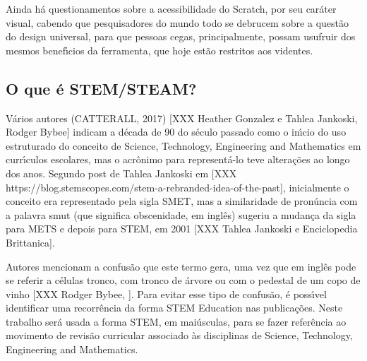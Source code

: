 \documentclass[
12pt,		%
openright,	%
twoside,  %
a4paper,			%
chapter=TITLE,		%
english,			%
french,				%
spanish,			%
brazil				%
]{USPSC-classe/USPSC}
\begin{document}
Ainda h\'a questionamentos sobre a acessibilidade do Scratch, por seu car\'ater visual, cabendo que pesquisadores do mundo todo se debrucem sobre a quest\~ao do design universal, para que pessoas cegas, principalmente, possam usufruir dos mesmos benef\'{\i}cios da ferramenta, que hoje est\~ao restritos aos videntes.

















\subsection[O que \'e STEM/STEAM?]{O que \'e STEM/STEAM?}\label{O que \'e STEM/STEAM?}
V\'arios autores  (CATTERALL, 2017)  [XXX Heather Gonzalez e  Tahlea Jankoski, Rodger Bybee] indicam a d\'ecada de 90 do s\'eculo passado como o in\'{\i}cio do uso estruturado do conceito de Science, Technology, Engineering and Mathematics em curr\'{\i}culos escolares, mas o acr\^onimo para represent\'a-lo teve altera\c{c}\~oes ao longo dos anos. Segundo post de Tahlea Jankoski em [XXX https://blog.stemscopes.com/stem-a-rebranded-idea-of-the-past], inicialmente o conceito era representado pela sigla SMET, mas a similaridade de pron\'uncia com a palavra \textquotedbl smut (que significa obscenidade, em ingl\^es) sugeriu a mudan\c{c}a da sigla para METS e depois para STEM, em 2001 [XXX Tahlea Jankoski e Enciclopedia Brittanica].

















Autores mencionam a confus\~ao que este termo gera, uma vez que em ingl\^es pode se referir a c\'elulas tronco, com tronco de \'arvore ou com o pedestal de um copo de vinho [XXX Rodger Bybee, ]. Para evitar esse tipo de confus\~ao, \'e poss\'{\i}vel identificar uma recorr\^encia da forma \textquotedbl STEM Education nas publica\c{c}\~oes. Neste trabalho ser\'a usada a forma STEM, em mai\'usculas, para se fazer refer\^encia ao movimento de revis\~ao curricular associado \`as disciplinas de \textquotedbl Science, Technology, Engineering and Mathematics.  
\end{document}
